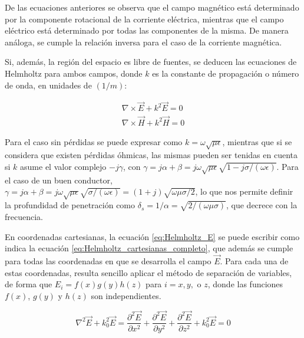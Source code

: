 De las ecuaciones anteriores se observa que el campo magnético está determinado por la componente rotacional de la corriente eléctrica, mientras que el campo eléctrico está determinado por todas las componentes de la misma. De manera análoga, se cumple la relación inversa para el caso de la corriente magnética.

Si, además, la región del espacio es libre de fuentes, se deducen las ecuaciones de Helmholtz para ambos campos, donde $k$ es la constante de propagación o número de onda, en unidades de $(1/m)$:

\begin{subequations}
	\label{eq:Helmholtz}
	\begin{align}
		\nabla \times \vec{E} + k^2 \vec{E} = 0 \label{eq:Helmholtz_E} \\
		\nabla \times \vec{H} + k^2 \vec{H} = 0 \label{eq:Helmholtz_H}
	\end{align}
\end{subequations}

Para el caso sin pérdidas se puede expresar como $k = \omega \sqrt{\mu \epsilon}$, mientras que si se considera que existen pérdidas óhmicas, las mismas pueden ser tenidas en cuenta si $k$ asume el valor complejo $-j\gamma$, con $\gamma = j\alpha + \beta = j \omega \sqrt{\mu \epsilon} \sqrt{1-j \sigma/(\omega \epsilon)}$. Para el caso de un buen conductor, $\gamma = j\alpha + \beta = j \omega \sqrt{\mu \epsilon} \sqrt{\sigma/(\omega \epsilon)} = (1+j) \sqrt{\omega \mu \sigma/2}$, lo que nos permite definir la profundidad de penetración como $\delta_s = 1/\alpha = \sqrt{2/(\omega \mu \sigma)}$, que decrece con la frecuencia.

En coordenadas cartesianas, la ecuación \ref{eq:Helmholtz_E} se puede escribir como indica la ecuación \ref{eq:Helmholtz_cartesianas_completo}, que además se cumple para todas las coordenadas en que se desarrolla el campo $\vec{E}$. Para cada una de estas coordenadas, resulta sencillo aplicar el método de separación de variables, de forma que $E_i = f(x)g(y)h(z)$ para $i=x, y,$ o $z$, donde las funciones $f(x)$, $g(y)$ y $h(z)$ son independientes.

\begin{equation}
	\label{eq:Helmholtz_cartesianas_completo}
	\nabla^2 \vec{E} + k_0^2 \vec{E} = \frac{\partial^2 \vec{E}}{\partial x^2} + \frac{\partial^2 \vec{E}}{\partial y^2} + \frac{\partial^2 \vec{E}}{\partial z^2} +  k_0^2 \vec{E} = 0
\end{equation}

